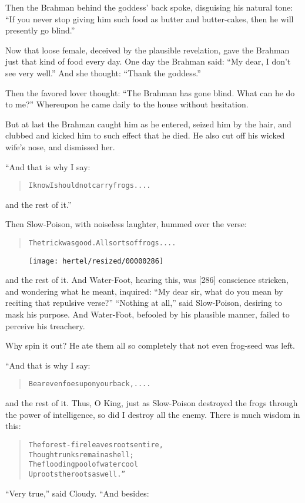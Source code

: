 \documentclass[article, twoside, 10pt]{memoir}
\renewenvironment{verbatim}{%
\begin{quote}%
\vskip -10pt%
\begin{alltt}\normalfont\small}{\end{alltt}%
\end{quote}%
\vskip -10pt
} %
\begin{document}
Then the Brahman behind the goddess' back spoke, disguising his
natural tone:
``If you never stop giving him such food as butter and butter-cakes, then he will presently go blind.''

Now that loose female, deceived by the plausible revelation, gave
the Brahman just that kind of food every day. One day the Brahman
said: ``My dear, I don't see very well.'' And she thought:
``Thank the goddess.''

Then the favored lover thought:
``The Brahman has gone blind. What can he do to me?'' Whereupon he
came daily to the house without hesitation.

But at last the Brahman caught him as he entered, seized him by the
hair, and clubbed and kicked him to such effect that he died. He
also cut off his wicked wife's nose, and dismissed her.

“And that is why I say:

\begin{verbatim}
I know I should not carry frogs ....
\end{verbatim}
and the rest of it.”

Then Slow-Poison, with noiseless laughter, hummed over the verse:

\begin{verbatim}
The trick was good. All sorts of frogs ....
\end{verbatim}
\begin{figure}[p]\texttt{[image: hertel/resized/00000286]}\end{figure}and the rest of it. And Water-Foot, hearing this, was [286]
conscience stricken, and wondering what he meant, inquired:
``My dear sir, what do you mean by reciting that repulsive verse?''
``Nothing at all,'' said Slow-Poison, desiring to mask his purpose.
And Water-Foot, befooled by his plausible manner, failed to
perceive his treachery.

Why spin it out? He ate them all so completely that not even
frog-seed was left.

“And that is why I say:

\begin{verbatim}
Bear even foes upon your back, ....
\end{verbatim}
and the rest of it. Thus, O King, just as Slow-Poison destroyed the
frogs through the power of intelligence, so did I destroy all the
enemy. There is much wisdom in this:

\begin{verbatim}
The forest-fire leaves roots entire,
    Though trunks remain a shell;
The flooding pool of water cool
    Uproots the roots as well.”
\end{verbatim}
``Very true,'' said Cloudy. “And besides:
\end{document}
